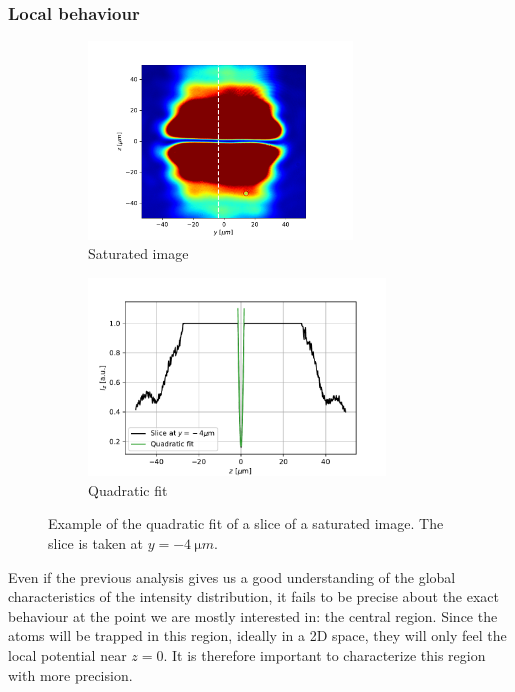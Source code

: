\subsubsection{Local behaviour}
\begin{figure}
    \begin{subfigure}{0.45\textwidth}
        \centering
        \includegraphics[height=5.25cm]{chapters/chapter_3/figures/fitquad_imsat.pdf}
        \caption{Saturated image}
        \label{fig:parabola_imsat}
    \end{subfigure}
    \begin{subfigure}{0.55\textwidth}
        \includegraphics[height=5.25cm]{chapters/chapter_3/figures/fitquad.pdf}
        \caption{Quadratic fit}
        \label{fig:parabola_fit}
    \end{subfigure}
    \caption{Example of the quadratic fit of a slice of a saturated image. The slice is taken at $y=\SI{-4}{\micro m}$.}
    \label{fig:parabola}
\end{figure}

Even if the previous analysis gives us a good understanding of the global characteristics of the intensity distribution, it fails to be precise about the exact behaviour at the point we are mostly interested in: the central region. Since the atoms will be trapped in this region, ideally in a 2D space, they will only feel the local potential near $z=0$. It is therefore important to characterize this region with more precision.

